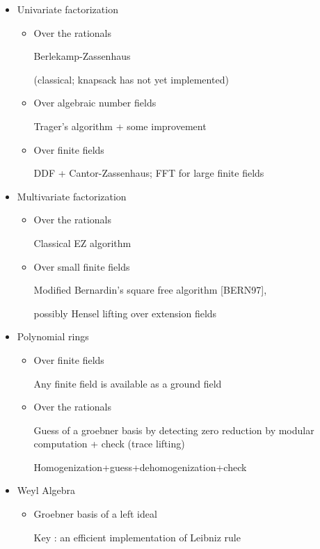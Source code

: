 \documentclass{slides}
\begin{document}
\begin{slide}{}
\begin{itemize}
\item Univariate factorization

\begin{itemize}
\item Over the rationals

Berlekamp-Zassenhaus

(classical; knapsack has not yet implemented)

\item Over algebraic number fields

Trager's algorithm + some improvement

\item Over finite fields

DDF + Cantor-Zassenhaus; FFT for large finite fields
\end{itemize}

\item Multivariate factorization

\begin{itemize}
\item Over the rationals

Classical EZ algorithm

\item Over small finite fields

Modified Bernardin's square free algorithm [BERN97],

possibly Hensel lifting over extension fields
\end{itemize}

\end{itemize}
\end{slide}

\begin{slide}{}
\begin{itemize}
\item Polynomial rings
\begin{itemize}
\item Over finite fields

Any finite field is available as a ground field

\item Over the rationals

Guess of a groebner basis by detecting zero reduction by modular computation
+ check (trace lifting)

Homogenization+guess+dehomogenization+check
\end{itemize}

\item Weyl Algebra

\begin{itemize}
\item Groebner basis of a left ideal

Key : an efficient implementation of Leibniz rule
\end{itemize}

\end{itemize}
\end{slide}
\end{document}
